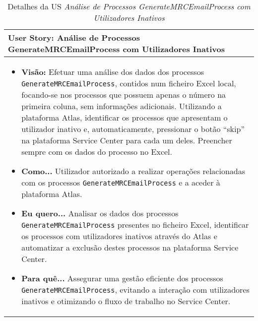                 \begin{table}[htbp] %
                    \centering
                    \caption{Detalhes da US \textit{Análise de Processos GenerateMRCEmailProcess com Utilizadores Inativos}}\label{table:python_us2}
                    \begin{tabularx}{1\textwidth}{|>{\raggedright\arraybackslash}X|}
                        \hline
                        \rowcolor{lightgray}
                        \textbf{User Story:} Análise de Processos GenerateMRCEmailProcess com Utilizadores Inativos \\
                        \hline
                        \rowcolor{lightgray!20}
                                        
                        \begin{itemize}
                            \item \textbf{Visão:} Efetuar uma análise dos dados dos processos \texttt{GenerateMRCEmailProcess}, contidos num ficheiro Excel local, focando-se nos processos que possuem apenas o número na primeira coluna, sem informações adicionais. Utilizando a plataforma Atlas, identificar os processos que apresentam o utilizador inativo e, automaticamente, pressionar o botão ``skip'' na plataforma Service Center para cada um deles. Preencher sempre com os dados do processo no Excel.

                            \item \textbf{Como...} Utilizador autorizado a realizar operações relacionadas com os processos \texttt{GenerateMRCEmailProcess} e a aceder à plataforma Atlas.

                            \item \textbf{Eu quero...} Analisar os dados dos processos \texttt{GenerateMRCEmailProcess} presentes no ficheiro Excel, identificar os processos com utilizadores inativos através do Atlas e automatizar a exclusão destes processos na plataforma Service Center.

                            \item \textbf{Para quê...} Assegurar uma gestão eficiente dos processos \texttt{GenerateMRCEmailProcess}, evitando a interação com utilizadores inativos e otimizando o fluxo de trabalho no Service Center.
                        \end{itemize}
                        \\
                        \hline
                    \end{tabularx}
                \end{table}
                
